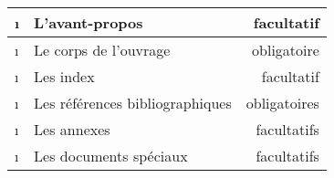 \documentclass[12pt,twoside,maitrise]{dms}
\theoremstyle{definition}
\numberwithin{equation}{section}
\numberwithin{table}{chapter}
\numberwithin{figure}{chapter}
\begin{document}
\begin{table}[p]
\begin{center}
\begin{tabular}{|l|l|r|}
      \i &  L'avant-propos & facultatif\\\hline
      \i &  Le corps de l'ouvrage& obligatoire\\\hline
      \i &  Les index& facultatif\\\hline
      \i &  Les références bibliographiques & obligatoires\\\hline
      \i &  Les annexes & facultatifs\\\hline
      \i &  Les documents spéciaux & facultatifs\\\hline
    \end{tabular}
  \end{center}
\end{table}
\end{document}
